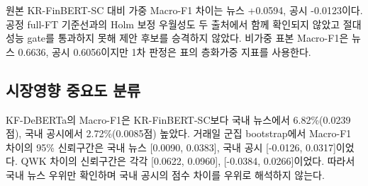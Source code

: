 \documentclass[10pt]{article}
\begin{document}
\begin{multicols}{2}
\begin{table}[H]
\centering
\small
\setlength{\tabcolsep}{3pt}
\caption{잠금 후 확증 Gold의 층화가중 Accuracy / Macro-F1 비교}
\label{tab:sent-ko}
\end{table}

원본 KR-FinBERT-SC 대비 가중 Macro-F1 차이는 뉴스 +0.0594, 공시 -0.0123이다. 공정 full-FT 기준선과의 Holm 보정 우월성도 두 출처에서 함께 확인되지 않았고 절대 성능 gate를 통과하지 못해 제안 후보를 승격하지 않았다. 비가중 표본 Macro-F1은 뉴스 0.6636, 공시 0.6056이지만 1차 판정은 표의 층화가중 지표를 사용한다.

\subsection{시장영향 중요도 분류}

\begin{table}[H]
\centering
{}
\caption{시간 분할 Test의 시장영향 중요도 성능}
\label{tab:impact-ko}
\end{table}

KF-DeBERTa의 Macro-F1은 KR-FinBERT-SC보다 국내 뉴스에서 6.82\%(0.0239점), 국내 공시에서 2.72\%(0.0085점) 높았다. 거래일 군집 bootstrap에서 Macro-F1 차이의 95\% 신뢰구간은 국내 뉴스 [0.0090, 0.0383], 국내 공시 [-0.0126, 0.0317]이었다. QWK 차이의 신뢰구간은 각각 [0.0622, 0.0960], [-0.0384, 0.0266]이었다. 따라서 국내 뉴스 우위만 확인하며 국내 공시의 점수 차이를 우위로 해석하지 않는다.


\end{multicols}
\end{document}

